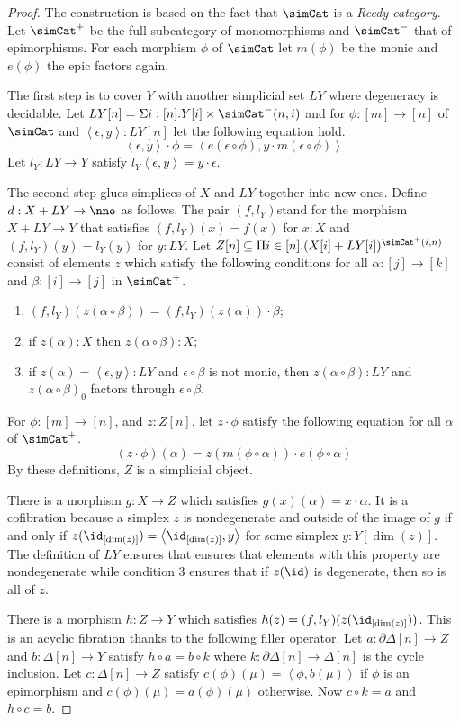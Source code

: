 \documentclass{tac}
\newcommand\hide[1]{}
\newcommand\of{:}
\newcommand\simplex\Delta
\newcommand\cycle{\partial\Delta}
\newcommand\tuplet[1]{\left\langle #1 \right\rangle}
\begin{document}
\begin{proof} The construction is based on the fact that $\simCat$ is a \emph{Reedy category}. \hide{cite!} Let $\simCat^+$ be the full subcategory of monomorphisms and $\simCat^-$ that of epimorphisms. For each morphism $\phi$ of $\simCat$ let $m(\phi)$ be the monic and $e(\phi)$ the epic factors again.

The first step is to cover $Y$ with another simplicial set $LY$ where degeneracy is decidable.
Let $LY[n] = \Sigma i\of[n]. Y[i]\times\simCat^-(n,i)$ and for $\phi\of [m]\to [n]$ of $\simCat$ and $\tuplet{\epsilon,y}\of LY[n]$ let the following equation hold.
\[\tuplet{\epsilon,y}\cdot \phi=\tuplet{e(\epsilon\circ \phi),y\cdot m(\epsilon\circ\phi)}\]
Let $l_Y\of LY\to Y$ satisfy $l_Y\tuplet{\epsilon,y}=y\cdot\epsilon$.

The second step glues simplices of $X$ and $LY$ together into new ones. Define $d\of X+LY\to\nno$ as follows. %
The pair $(f,l_Y)$stand for the morphism $X+LY\to Y$ that satisfies $(f,l_Y)(x)=f(x)$ for $x\of X$ and $(f,l_Y)(y) = l_Y(y)$ for $y\of LY$. Let $Z[n]\subseteq \Pi i\in[n].(X[i]+LY[i])^{\simCat^+(i,n)}$ consist of elements $z$ which satisfy the following conditions for all $\alpha\of [j]\to [k]$ and $\beta\of [i]\to[j]$ in $\simCat^+$.
\begin{enumerate}
\item $(f,l_Y)(z(\alpha\circ\beta)) = (f,l_Y)(z(\alpha))\cdot\beta$;
\item if $z(\alpha)\of X$ then $z(\alpha\circ\beta)\of X$;
\item if $z(\alpha)=\tuplet{\epsilon,y}\of LY$ and $\epsilon\circ\beta$ is not monic, then $z(\alpha\circ\beta)\of LY$ and $z(\alpha\circ\beta)_0$ factors through $\epsilon\circ\beta$.
\end{enumerate}
For $\phi\of[m]\to [n]$, and $z\of Z[n]$, let $z\cdot\phi$ satisfy the following equation for all $\alpha$ of $\simCat^+$.
\[ (z\cdot\phi)(\alpha) = z(m(\phi\circ\alpha))\cdot e(\phi\circ \alpha) \]
By these definitions, $Z$ is a simplicial object.

There is a morphism $g\of X\to Z$ which satisfies $g(x)(\alpha) = x\cdot\alpha$. It is a cofibration because a simplex $z$ is nondegenerate and outside of the image of $g$ if and only if $z(\id_{[\dim(z)]}) = \tuplet{\id_{[\dim(z)]},y}$ for some simplex $y\of Y[\dim(z)]$. The definition of $LY$ ensures that ensures that elements with this property are nondegenerate while condition 3 ensures that if $z(\id)$ is degenerate, then so is all of $z$.

There is a morphism $h\of Z\to Y$ which satisfies $h(z) = (f,l_Y)(z(\id_{[\dim(z)]}))$. This is an acyclic fibration thanks to the following filler operator. Let $a\of \cycle[n]\to Z$ and $b\of \simplex[n]\to Y$ satisfy $h\circ a = b\circ k$ where $k\of\cycle[n]\to\simplex[n]$ is the cycle inclusion. Let $c\of \simplex[n]\to Z$ satisfy $c(\phi)(\mu) = \tuplet{\phi,b(\mu)}$ if $\phi$ is an epimorphism and $c(\phi)(\mu) = a(\phi)(\mu)$ otherwise. Now $c\circ k = a$ and $h\circ c = b$.
\end{proof}
\end{document}
